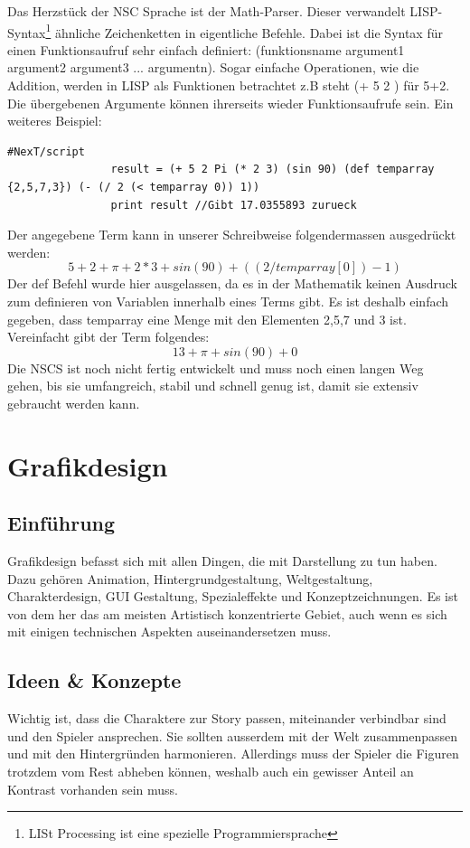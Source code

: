 \documentclass[12pt,a4paper,titlepage]{article}
\begin{document}
			Das Herzstück der NSC Sprache ist der Math-Parser. Dieser verwandelt LISP-Syntax\footnote{LISt Processing ist eine spezielle Programmiersprache} ähnliche Zeichenketten in eigentliche Befehle. Dabei ist die Syntax für einen Funktionsaufruf sehr einfach definiert: (funktionsname argument1 argument2 argument3 ... argumentn). Sogar einfache Operationen, wie die Addition, werden in LISP als Funktionen betrachtet z.B steht (+ 5 2 ) für 5+2. Die übergebenen Argumente können ihrerseits wieder Funktionsaufrufe sein. Ein weiteres Beispiel:
			\begin{lstlisting}[label=NSCEX2,caption=NSC-Math Beispiel]
				#NexT/script 
				result = (+ 5 2 Pi (* 2 3) (sin 90) (def temparray {2,5,7,3}) (- (/ 2 (< temparray 0)) 1))
				print result //Gibt 17.0355893 zurueck
			\end{lstlisting}
			Der angegebene Term kann in unserer Schreibweise folgendermassen ausgedrückt werden:
			$$5+2+\pi+2*3+sin(90)+((2/temparray[0])-1)$$
			Der def Befehl wurde hier ausgelassen, da es in der Mathematik keinen Ausdruck zum definieren von Variablen innerhalb eines Terms gibt. Es ist deshalb einfach gegeben, dass temparray eine Menge mit den Elementen 2,5,7 und 3 ist. Vereinfacht gibt der Term folgendes:
			$$13+\pi+sin(90)+0$$
			Die NSCS ist noch nicht fertig entwickelt und muss noch einen langen Weg gehen, bis sie umfangreich, stabil und schnell genug ist, damit sie extensiv gebraucht werden kann.\\
			

\section{Grafikdesign}
	\subsection{Einführung}
		Grafikdesign befasst sich mit allen Dingen, die mit Darstellung zu tun haben. Dazu gehören Animation, Hintergrundgestaltung, Weltgestaltung, Charakterdesign, GUI Gestaltung, Spezialeffekte und Konzeptzeichnungen. Es ist von dem her das am meisten Artistisch konzentrierte Gebiet, auch wenn es sich mit einigen technischen Aspekten auseinandersetzen muss.
		
	\subsection{Ideen \& Konzepte}
		Wichtig ist, dass die Charaktere zur Story passen, miteinander verbindbar sind und den Spieler ansprechen. Sie sollten ausserdem mit der Welt zusammenpassen und mit den Hintergründen harmonieren. Allerdings muss der Spieler die Figuren trotzdem vom Rest abheben können, weshalb auch ein gewisser Anteil an Kontrast vorhanden sein muss.\\
		
\end{document}
